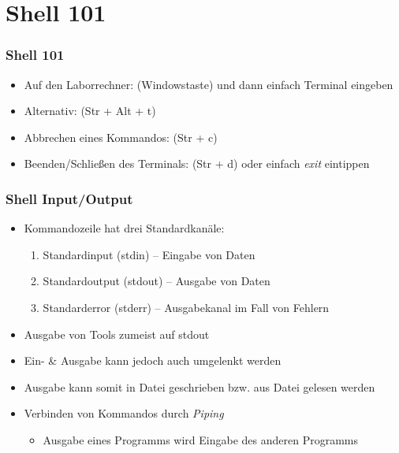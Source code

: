 \documentclass[xcolor=dvipsnames,aspectratio=169]{beamer}
\begin{document}
\section{Shell 101}
\begin{frame}
	\frametitle{Shell 101}
	\begin{itemize}
		\item Auf den Laborrechner: \keys{\winmenu} (Windowstaste) und dann einfach Terminal eingeben
		\item Alternativ:  (Str + Alt + t)
		\item Abbrechen eines Kommandos:  (Str + c)
		\item Beenden/Schließen des Terminals:  (Str + d) oder einfach \emph{exit} eintippen
	\end{itemize}
\end{frame}

\begin{frame}
	\frametitle{Shell Input/Output}
	\begin{itemize}
		\item Kommandozeile hat drei Standardkanäle:
		\begin{enumerate}
			\item Standardinput (stdin) -- Eingabe von Daten
			\item Standardoutput (stdout) -- Ausgabe von Daten
			\item Standarderror (stderr) -- Ausgabekanal im Fall von Fehlern
		\end{enumerate}
		\item Ausgabe von Tools zumeist auf stdout
		\item Ein- \& Ausgabe kann jedoch auch umgelenkt werden
		\item Ausgabe kann somit in Datei geschrieben bzw. aus Datei gelesen werden
		\item Verbinden von Kommandos durch \emph{Piping}
		\begin{itemize}
			\item Ausgabe eines Programms wird Eingabe des anderen Programms
		\end{itemize}
	\end{itemize}
\end{frame}
\end{document}
